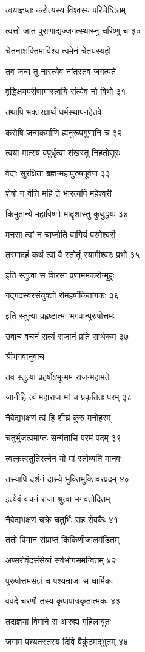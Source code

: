 त्वयाज्ञप्तः करोत्यस्य विश्वस्य परिचेष्टितम्

त्वत्तो जातं पुराणाद्यज्जगत्स्थास्नु चरिष्णु च ३०

चेतनाशक्तिमाविश्य त्वमेनं चेतयस्यहो

तव जन्म तु नास्त्येव नांतस्तव जगत्पते

वृद्धिक्षयपरीणामास्त्वयि संत्येव नो विभो ३१

तथापि भक्तरक्षार्थं धर्मस्थापनहेतवे

करोषि जन्मकर्माणि ह्यनुरूपगुणानि च ३२

त्वया मात्स्यं वपुर्धृत्वा शंखस्तु निहतोसुरः

वेदाः सुरक्षिता ब्रह्मन्महापुरुषपूर्वज ३३

शेषो न वेत्ति महि ते भारत्यपि महेश्वरी

किमुतान्ये महाविष्णो मादृशास्तु कुबुद्धयः ३४

मनसा त्वां न चाप्नोति वागियं परमेश्वरी

तस्मादहं कथं त्वां वै स्तोतुं स्यामीश्वरः प्रभो ३५

इति स्तुत्वा स शिरसा प्रणाममकरोन्मुहुः

गद्गदस्वरसंयुक्तो रोमहर्षांकितांगकः ३६

इति स्तुत्या प्रहृष्टात्मा भगवान्पुरुषोत्तमः

उवाच वचनं सत्यं राजानं प्रति सार्थकम् ३७

श्रीभगवानुवाच

तव स्तुत्या प्रहर्षोऽभून्मम राजन्महामते

जानीहि त्वं महाराज मां च प्रकृतितः परम् ३८

नैवेद्यभक्षणं त्वं हि शीघ्रं कुरु मनोहरम्

चतुर्भुजत्वमाप्तः सन्गंतासि परमं पदम् ३९

त्वत्कृत्स्तुतिरत्नेन यो मां स्तोष्यति मानवः

तस्यापि दर्शनं दास्ये भुक्तिमुक्तिवरप्रदम् ४०

इत्येवं वचनं राजा श्रुत्वा भगवतोदितम्

नैवेद्यभक्षणं चक्रे चतुर्भिः सह सेवकैः ४१

ततो विमानं संप्राप्तं किंकिणीजालमंडितम्

अप्सरोवृंदसंसेव्यं सर्वभोगसमन्वितम् ४२

पुरुषोत्तमसंज्ञं च पश्यन्राजा स धार्मिकः

ववंदे चरणौ तस्य कृपापात्रकृतात्मकः ४३

तदाज्ञया विमाने स आरुह्य महिलायुतः

जगाम पश्यतस्तस्य दिवि वैकुंठमद्भुतम् ४४

